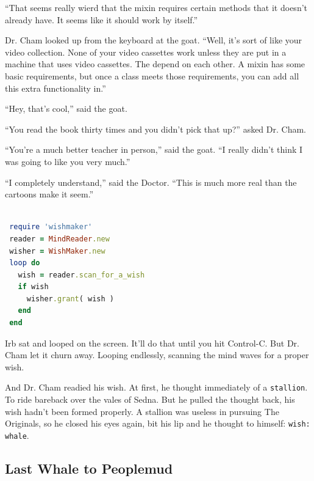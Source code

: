 \documentclass[10pt,twoside]{report}
\begin{document}
``That seems really wierd that the mixin requires certain methods that
it doesn't already have. It seems like it should work by itself.''

Dr. Cham looked up from the keyboard at the goat.  ``Well, it's sort
of like your video collection. None of your video cassettes work
unless they are put in a machine that uses video cassettes. The depend
on each other.  A mixin has some basic requirements, but once a class
meets those requirements, you can add all this extra functionality
in.''

``Hey, that's cool,'' said the goat.

``You read the book thirty times and you didn't pick that up?'' asked
Dr. Cham.

``You're a much better teacher in person,'' said the goat.  ``I really
didn't think I was going to like you very much.''

``I completely understand,'' said the Doctor.  ``This is much more
real than the cartoons make it seem.''


\begin{lstlisting}[basicstyle=\ttfamily\color{basiccolor},
    commentstyle = \ttfamily\color{commentcolor},
    keywordstyle=\ttfamily\color{keywordscolor},
    stringstyle=\color{stringcolor},
    language=Ruby,
    basicstyle=\small\ttfamily,
    showstringspaces=false,
  ]

 require 'wishmaker'
 reader = MindReader.new
 wisher = WishMaker.new
 loop do
   wish = reader.scan_for_a_wish
   if wish
     wisher.grant( wish )
   end
 end

\end{lstlisting}



Irb sat and looped on the screen.  It'll do that until you hit
Control-C.  But Dr. Cham let it churn away.  Looping endlessly,
scanning the mind waves for a proper wish.

And Dr. Cham readied his wish.  At first, he thought immediately of a
\lstinline[breaklines=true]|stallion|.  To ride bareback over the
vales of Sedna.  But he pulled the thought back, his wish hadn't been
formed properly. A stallion was useless in pursuing The Originals, so
he closed his eyes again, bit his lip and he thought to himself:
\lstinline[breaklines=true]|wish: whale|.



\subsection{Last Whale to Peoplemud}
\end{document}
